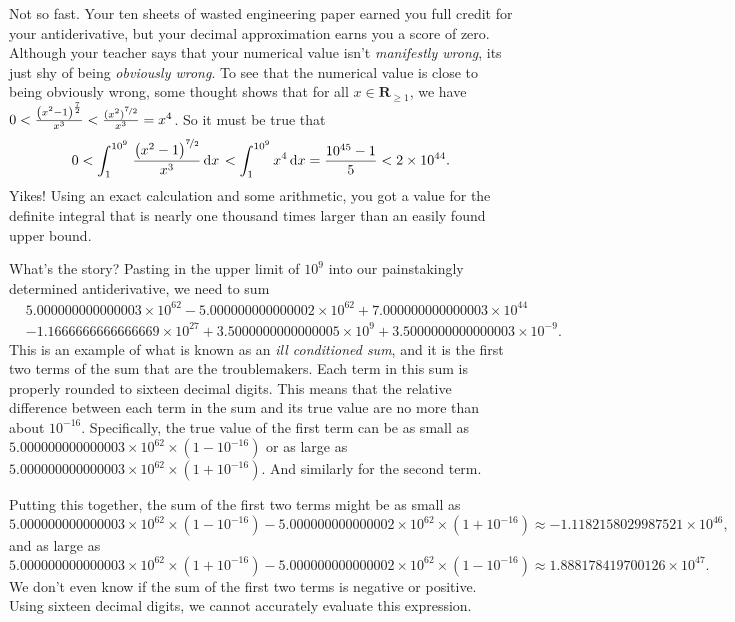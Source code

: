 \documentclass[12pt,fleqn]{article}
\newcommand{\reals}{\mathbf{R}}
\begin{document}
Not so fast. Your ten sheets of wasted engineering paper earned
you full credit for your antiderivative, but your
decimal approximation earns you a score of zero. Although your teacher says that 
your numerical value isn't \emph{manifestly wrong}, its 
just shy of being \emph{obviously wrong}. To see that the 
numerical value is close to being obviously wrong, some thought 
shows that for all $x \in \reals_{\geq 1}$, we have $0 < \frac{{{\left( {{x}^{2}}-1\right) }^{\frac{7}{2}}}}{{{x}^{3}}}
< \frac{(x^2)^{\nicefrac{7}{2}}} {x^3} = x^4$. So it must be true that
\begin{equation*}
   0 <  \int_1^{10^9} {\left. \frac{{{\left( {{x}^{2}}-1\right) }^{\nicefrac{7}{2}}}}{{{x}^{3}}} \, \mathrm{d}x\right.}
       < \int_1^{10^9} x^4 \, \mathrm{d}x =  \frac{10^{45} - 1 }{5} < 2  \times 10^{44}.
\end{equation*}
Yikes! Using an exact calculation and some arithmetic, you got a
value for the definite integral that is nearly one thousand times larger than
an easily found upper bound.

What's the story?  Pasting in the upper limit of $10^9$ into our 
painstakingly determined antiderivative, we need to sum
\begin{align*}
&5.000000000000003 \times  {{10}^{62}} - 5.000000000000002  \times 
{{10}^{62}} + 7.000000000000003 \times {{10}^{44}}  \\
&-1.1666666666666669 \times {{10}^{27}} + 
3.5000000000000005 \times {{10}^{9}} + 3.5000000000000003 \times {{10}^{-9}}.
\end{align*}
This is an example of what is known as an \emph{ill conditioned sum}, and 
it is the first two terms of the sum that are the 
troublemakers. Each term in this sum is properly rounded to sixteen 
decimal digits. This means that the relative difference between 
each term in the sum and its true value are no more than about 
$10^{-16}$. Specifically, the true value of the first term 
can be as small as $5.000000000000003 \times  {{10}^{62}} \times
(1 - 10^{-16})$ or as large as $5.000000000000003 \times  {{10}^{62}} 
\times (1 + 10^{-16})$. And similarly for the second term.

Putting this together, the sum of the first two terms might be as small
as 
\begin{equation*}
  5.000000000000003 \times 10^{62} \times (1 -  10^{-16}) - 5
   .000000000000002 \times 10^{62} \times  (1  + 10^{-16})
   \approx -1.1182158029987521 \times 10^{46},
\end{equation*}
and as large as 
\begin{equation*}
  5.000000000000003 \times 10^{62} \times (1 + 10^{-16}) - 5
   .000000000000002 \times 10^{62} \times  (1  - 10^{-16})
   \approx 1.888178419700126 \times {{10}^{47}}.
\end{equation*}
We don't even know if the sum of the first two terms is negative 
or positive.  Using sixteen decimal digits, we cannot accurately
evaluate this expression.
\end{document}
